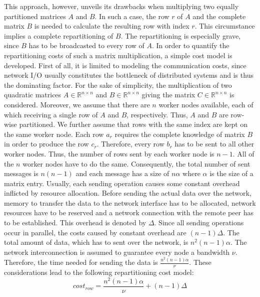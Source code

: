 This approach, however, unveils its drawbacks when multiplying two equally partitioned matrices $A$ and $B$. In such a case, the row $r$ of $A$ and the complete matrix $B$ is needed to calculate the resulting row with index $r$. This circumstance implies a complete repartitioning of $B$. The repartitioning is especially grave, since $B$ has to be broadcasted to every row of $A$. In order to quantify the repartitioning costs of such a matrix multiplication, a simple cost model is developed. First of all, it is limited to modeling the communication costs, since network I/O usually constitutes the bottleneck of distributed systems and is thus the dominating factor. For the sake of simplicity, the multiplication of two quadratic matrices $A \in \mathbb{R}^{n\times n}$ and $B \in \mathbb{R}^{n\times n}$ giving the matrix $C\in \mathbb{R}^{n \times n}$ is considered. Moreover, we assume that there are $n$ worker nodes available, each of which receiving a single row of $A$ and $B$, respectively. Thus, $A$ and $B$ are row-wise partitioned. We further assume that rows with the same index are kept on the same worker node. Each row $a_r$ requires the complete knowledge of matrix $B$ in order to produce the row $c_r$. Therefore, every row $b_r$ has to be sent to all other worker nodes. Thus, the number of rows sent by each worker node is $n-1$. All of the $n$ worker nodes have to do the same. Consequently, the total number of sent messages is $n(n-1)$ and each message has a size of $n\alpha$ where $\alpha$ is the size of a matrix entry. Usually, each sending operation causes some constant overhead inflicted by resource allocation. Before sending the actual data over the network, memory to transfer the data to the network interface has to be allocated, network resources have to be reserved and a network connection with the remote peer has to be established. This overhead is denoted by $\Delta$. Since all sending operations occur in parallel, the costs caused by constant overhead are $(n-1)\Delta$. The total amount of data, which has to sent over the network, is $n^2(n-1)\alpha$. The network interconnection is assumed to guarantee every node a bandwidth $\nu$. Therefore, the time needed for sending the data is $\frac{n^2(n-1)\alpha}{\nu}$. These considerations lead to the following repartitioning cost model:
\begin{displaymath}
	cost_{row} = \frac{n^2(n-1)\alpha}{\nu} + (n-1)\Delta
\end{displaymath}
